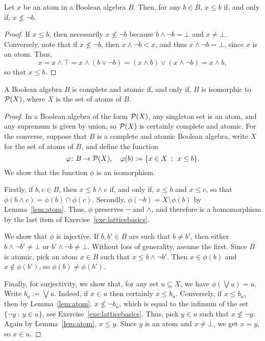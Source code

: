 \begin{lemma}\label{lem:atom}
Let $x$ be an atom in a Boolean algebra $B$. Then, for any $b \in B$, $x \leq b$ if, and only if, $x \nleq \neg b$.
\end{lemma}
\begin{proof}
If $x \leq b$, then necessarily $x \nleq \neg b$ because $b \wedge \neg b = \bot$ and $x \neq \bot$. Conversely, note that if $x \nleq \neg b$, then $x \wedge \neg b < x$, and thus $x \wedge \neg b = \bot$, since $x$ is an atom. Thus,
  \[x = x \wedge \top = x \wedge (b \vee \neg b) = (x \wedge b) \vee (x \wedge \neg b) = x \wedge b,\]
  so that $x \leq b$.
\end{proof}
\begin{theorem}\label{thm:BAdiscdual}
  A Boolean algebra $B$ is complete and atomic if, and only if, $B$ is isomorphic to $\mathcal{P}(X)$, where $X$ is the set of atoms of $B$.
\end{theorem}
\begin{proof}
  In a Boolean algebra of the form $\mathcal{P}(X)$, any singleton set is an atom, and any supremum is given by union, so $\mathcal{P}(X)$ is certainly complete and atomic. For the converse, suppose that $B$ is a complete and atomic Boolean algebra, write $X$ for the set of atoms of $B$, and define the function
  \[ \varphi \colon B \to \mathcal{P}(X), \quad \varphi(b) := \{x \in X \ \colon \ x \leq b\}.\]
  We show that the function $\phi$ is an isomorphism.

  Firstly, if $b, c \in B$, then $x \leq b \wedge c$ if, and only if, $x \leq b$ and $x \leq c$, so that $\phi(b \wedge c) = \phi(b) \cap \phi(c)$. Secondly, $\phi(\neg b) = X \setminus \phi(b)$ by Lemma~\ref{lem:atom}. Thus, $\phi$ preserves $\neg$ and $\wedge$, and therefore is a homomorphism by the last item of Exercise~\ref{exe:latticebasics}.

  We show that $\phi$ is injective. If $b, b' \in B$ are such that $b \neq b'$, then either $b \wedge \neg b' \neq \bot$ or $b' \wedge \neg b \neq \bot$. Without loss of generality, assume the first. Since $B$ is atomic, pick an atom $x \in B$ such that $x \leq b \wedge \neg b'$. Then $x \in \phi(b)$ and $x \not\in \phi(b')$, so $\phi(b) \neq \phi(b')$.

  Finally, for surjectivity, we show that, for any set $u \subseteq X$, we have $\phi(\bigvee u) = u$. Write $b_u := \bigvee u$. Indeed, if $x \in u$ then certainly $x \leq b_u$. Conversely, if $x \leq b_u$, then by Lemma~\ref{lem:atom}, $x \nleq \neg b_u$, which is equal to the infimum of the set $\{\neg y \ \colon \ y \in u\}$, see Exercise~\ref{exe:latticebasics}. Thus, pick $y \in u$ such that $x \nleq \neg y$. Again by Lemma~\ref{lem:atom}, $x \leq y$. Since $y$ is an atom and $x \neq \bot$, we get $x = y$, so $x \in u$.
\end{proof}
